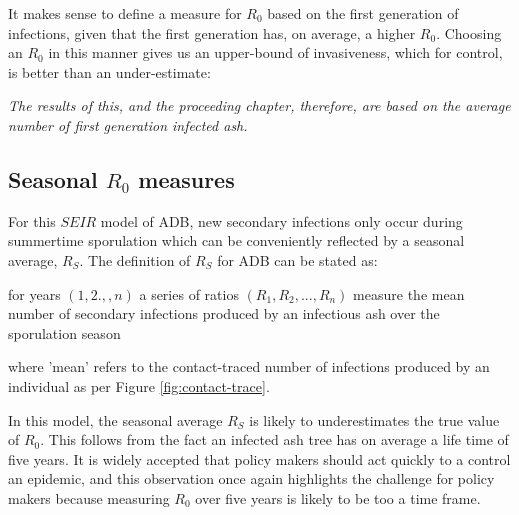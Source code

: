 It makes sense to define a measure for $R_0$ based on the first generation of infections, given that the first generation has, on average, a higher $R_0$. Choosing an $R_0$ in this manner gives us an upper-bound of invasiveness, which for control, is better than an under-estimate:

\textit{The results of this, and the proceeding chapter, therefore, are based on the average number of first generation infected ash.}


\subsection{Seasonal $R_0$ measures}
For this $SEIR$ model of ADB, new secondary infections only occur during summertime sporulation which can be conveniently reflected by a seasonal average, $R_S$. The definition of $R_S$ for ADB can be stated as:
\begin{defn}
for years $(1,2.,,n)$ a series of ratios $(R_{1},R_2,...,R_{n})$ measure the mean number of secondary infections produced by an infectious ash over the sporulation season
\end{defn}
where 'mean' refers to the contact-traced number of infections produced by an individual as per Figure \ref{fig:contact-trace}.

In this model, the seasonal average $R_S$ is likely to underestimates the true value of $R_0$. This follows from the fact an infected ash tree has on average a life time of five years. It is widely accepted that policy makers should act quickly to a control an epidemic, and this observation once again highlights the challenge for policy makers because measuring $R_0$ over five years is likely to be too a time frame. 






